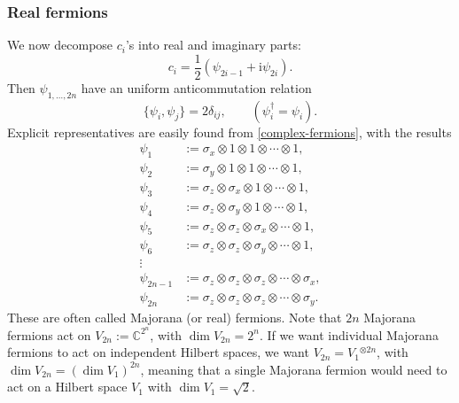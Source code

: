 \documentclass[12pt]{article}
\numberwithin{equation}{section}
\numberwithin{figure}{section}
\theoremstyle{remark}
\def\bC{\mathbb{C}}
\begin{document}
\subsubsection{Real fermions}
We now decompose $c_i$'s into real and imaginary parts: \begin{equation}
c_i = \frac12(\psi_{2i-1} + \mathrm{i} \psi_{2i}).
\end{equation}
Then $\psi_{1,\ldots,2n}$ have an uniform anticommutation relation \begin{equation}
\{\psi_i,\psi_j\}=2\delta_{ij}, \qquad (\psi_i^\dagger = \psi_i).
\label{maj-ac}
\end{equation} 
Explicit representatives are easily found from \eqref{complex-fermions},
with the results \begin{equation}
\begin{aligned}
\psi_1 &:= \sigma_x \otimes 1 \otimes 1\otimes \cdots \otimes 1 ,\\
\psi_2 &:= \sigma_y \otimes 1 \otimes 1\otimes \cdots \otimes 1 ,\\
\psi_3 &:= \sigma_z \otimes \sigma_x \otimes 1\otimes \cdots \otimes 1 ,\\
\psi_4 &:= \sigma_z \otimes \sigma_y \otimes 1\otimes \cdots \otimes 1 ,\\
\psi_5 &:= \sigma_z \otimes \sigma_z \otimes \sigma_x \otimes \cdots \otimes 1 ,\\
\psi_6 &:= \sigma_z \otimes \sigma_z \otimes \sigma_y \otimes \cdots \otimes 1 ,\\
\vdots\\
\psi_{2n-1} &:= \sigma_z \otimes\sigma_z \otimes \sigma_z \otimes\cdots\otimes \sigma_x,\\
\psi_{2n} &:= \sigma_z \otimes\sigma_z \otimes \sigma_z \otimes\cdots\otimes \sigma_y.
\end{aligned}
\end{equation}
These are often called Majorana (or real) fermions.
Note that $2n$ Majorana fermions act on $V_{2n}:=\bC^{2^n}$, with $\dim V_{2n}=2^n$.
If we want individual Majorana fermions to act on independent Hilbert spaces,
we want $V_{2n} = V_1{}^{\otimes 2n}$, with $\dim V_{2n}= (\dim V_1)^{2n}$,
meaning that a single Majorana fermion would need to act on 
a Hilbert space $V_1$ with $\dim V_1=\sqrt2$.
\end{document}
